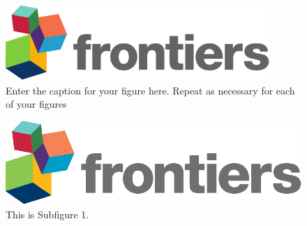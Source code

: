 \documentclass[utf8]{FrontiersinHarvard}
\begin{document}
    \begin{figure}[h!]
        \begin{center}
            \includegraphics[width=10cm]{logo1}%
        \end{center}
        \caption{ Enter the caption for your figure here. Repeat as necessary for each of your figures}\label{fig:1}
    \end{figure}

    \setcounter{figure}{2}
    \setcounter{subfigure}{0}
    \begin{subfigure}
        \setcounter{figure}{2}
        \setcounter{subfigure}{0}
        \centering
        \begin{minipage}[b]{0.5\textwidth}
            \includegraphics[width=\linewidth]{logo1.eps}
            \caption{This is Subfigure 1.}
            \label{fig:Subfigure 1}
        \end{minipage}


\end{subfigure}
\end{document}
